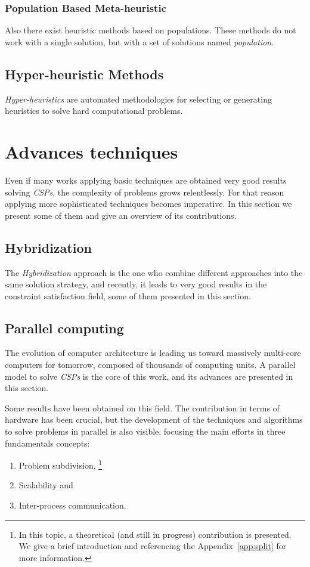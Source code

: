 \documentclass[a4paper]{book} %
\newcommand{\csp}{\textit{CSP}}
\newcommand{\csps}{\csp\textit{s}}
\begin{document}
\subsubsection{Population Based Meta-heuristic}

Also there exist heuristic methods based on populations. These methods do not work with a single solution, but with a set of solutions named {\it population}. 

\subsection{Hyper-heuristic Methods}

\textit{Hyper-heuristics} are automated methodologies for selecting or generating heuristics to solve hard computational problems.

\section{Advances techniques}

Even if many works applying basic techniques are obtained very good results solving \csps{}, the complexity of problems grows relentlessly. For that reason applying more sophisticated techniques becomes imperative. In this section we present some of them and give an overview of its contributions. 

\subsection{Hybridization}

The \textit{Hybridization} approach is the one who combine different approaches into the same solution strategy, and recently, it leads to very good results in the constraint satisfaction field, some of them presented in this section.

\subsection{Parallel computing}

The evolution of computer architecture is leading us toward massively multi-core computers for tomorrow, composed of thousands of computing units. A parallel model to solve \csps{} is the core of this work, and its advances are presented in this section.

Some results have been obtained on this field. The contribution in terms of hardware has been crucial, but the development of the techniques and algorithms to solve problems in parallel is
also visible, focusing the main efforts in three fundamentals concepts:
\begin{enumerate}
\item Problem subdivision, \footnote{In this topic, a theoretical (and still in progress) contribution is presented. We give a brief introduction and referencing the Appendix~\ref{app:split} for more information.}
\item Scalability and
\item Inter-process communication.
\end{enumerate}
\end{document}
